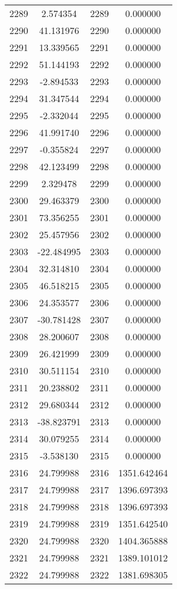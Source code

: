 \documentclass[12pt]{article}
\begin{document}
\begin{longtable}{@{}cccc@{}}
2289 & 2.574354 & 2289 & 0.000000 \\
2290 & 41.131976 & 2290 & 0.000000 \\
2291 & 13.339565 & 2291 & 0.000000 \\
2292 & 51.144193 & 2292 & 0.000000 \\
2293 & -2.894533 & 2293 & 0.000000 \\
2294 & 31.347544 & 2294 & 0.000000 \\
2295 & -2.332044 & 2295 & 0.000000 \\
2296 & 41.991740 & 2296 & 0.000000 \\
2297 & -0.355824 & 2297 & 0.000000 \\
2298 & 42.123499 & 2298 & 0.000000 \\
2299 & 2.329478 & 2299 & 0.000000 \\
2300 & 29.463379 & 2300 & 0.000000 \\
2301 & 73.356255 & 2301 & 0.000000 \\
2302 & 25.457956 & 2302 & 0.000000 \\
2303 & -22.484995 & 2303 & 0.000000 \\
2304 & 32.314810 & 2304 & 0.000000 \\
2305 & 46.518215 & 2305 & 0.000000 \\
2306 & 24.353577 & 2306 & 0.000000 \\
2307 & -30.781428 & 2307 & 0.000000 \\
2308 & 28.200607 & 2308 & 0.000000 \\
2309 & 26.421999 & 2309 & 0.000000 \\
2310 & 30.511154 & 2310 & 0.000000 \\
2311 & 20.238802 & 2311 & 0.000000 \\
2312 & 29.680344 & 2312 & 0.000000 \\
2313 & -38.823791 & 2313 & 0.000000 \\
2314 & 30.079255 & 2314 & 0.000000 \\
2315 & -3.538130 & 2315 & 0.000000 \\
2316 & 24.799988 & 2316 & 1351.642464 \\
2317 & 24.799988 & 2317 & 1396.697393 \\
2318 & 24.799988 & 2318 & 1396.697393 \\
2319 & 24.799988 & 2319 & 1351.642540 \\
2320 & 24.799988 & 2320 & 1404.365888 \\
2321 & 24.799988 & 2321 & 1389.101012 \\
2322 & 24.799988 & 2322 & 1381.698305 \\

\end{longtable}
\end{document}
